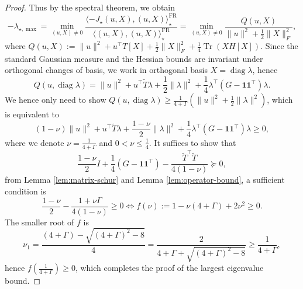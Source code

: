 \documentclass[11pt]{article}
\theoremstyle{plain}
\theoremstyle{definition}
\theoremstyle{remark}
\newcommand{\Tr}{\operatorname{Tr}}
\newcommand{\diag}{\operatorname{diag}}
\begin{document}
\begin{proof}
    Thus by the spectral theorem, we obtain
    \begin{equation*}
        -\lambda_{\star, \max} = \min_{(u, X) \neq 0} \frac{\langle -J_\star (u, X), (u, X) \rangle_\star^\mathrm{FR}}{\langle (u, X), (u, X) \rangle_\star^\mathrm{FR}} = \min_{(u, X) \ne 0} \frac{Q(u, X)}{\|u\|^2 + \frac{1}{2} \|X\|_F^2},
    \end{equation*}
    where $Q(u, X) := \|u\|^2 + u^\top T[X] + \frac{1}{2} \|X\|_F^2 + \frac{1}{4} \Tr(X H[X])$. 
    Since the standard Gaussian measure and the Hessian bounds are invariant under orthogonal changes of basis, we work in orthogonal basis $X = \diag \lambda$, hence
    \begin{equation*}
        Q(u, \diag \lambda) = \|u\|^2 + u^\top \widetilde{T} \lambda + \frac{1}{2} \|\lambda\|^2 + \frac{1}{4} \lambda^\top (G - \mathbf{1} \mathbf{1}^\top) \lambda.
    \end{equation*}
    We hence only need to show $Q(u, \diag \lambda) \geq \frac{1}{4 + \Gamma} (\|u\|^2 + \frac{1}{2} \|\lambda\|^2)$, which is equivalent to 
    \begin{equation*}
        \left( 1 - \nu \right) \|u\|^2 + u^\top \widetilde{T} \lambda + \frac{1 - \nu}{2} \|\lambda\|^2 + \frac{1}{4} \lambda^\top (G - \mathbf{1} \mathbf{1}^\top) \lambda \geq 0,
    \end{equation*}
    where we denote $\nu = \frac{1}{4 + \Gamma}$ and $0 < \nu \leq \frac{1}{4}$.
    It suffices to show that
    \begin{equation*}
        \frac{1 - \nu}{2} I + \frac{1}{4} (G - \mathbf{1} \mathbf{1}^\top) - \frac{\widetilde{T}^\top \widetilde{T}}{4(1 - \nu)} \succeq 0,
    \end{equation*}
    from Lemma \ref{lem:matrix-schur} and Lemma \ref{lem:operator-bound}, a sufficient condition is
    \begin{equation*}
        \frac{1 - \nu}{2} - \frac{1 + \nu \Gamma}{4 (1 - \nu)} \geq 0 \Longleftrightarrow f(\nu) := 1 - \nu (4 + \Gamma) + 2\nu^2 \geq 0.
    \end{equation*}
    The smaller root of $f$ is 
    \begin{equation*}
        \nu_1 = \frac{(4 + \Gamma) - \sqrt{(4 + \Gamma)^2 - 8}}{4} = \frac{2}{4 + \Gamma + \sqrt{(4 + \Gamma)^2 - 8}} \geq \frac{1}{4 + \Gamma},
    \end{equation*}
    hence $f (\frac{1}{4 + \Gamma}) \geq 0$, which completes the proof of the largest eigenvalue bound. 


\end{proof}
\end{document}
